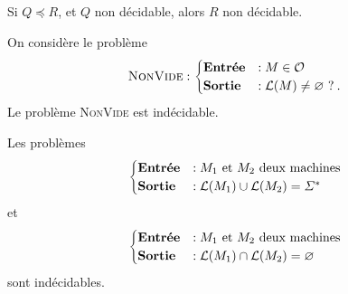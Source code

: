 \begin{crlr}
	Si $Q \preceq R$, et $Q$\/ non décidable, alors $R$\/ non décidable.
\end{crlr}

\begin{exm}
	On considère le problème \[
		\text{\textsc{NonVide}} : \begin{cases}
			\text{\textbf{Entrée}} &: M \in \mathscr{O}\\
			\text{\textbf{Sortie}} &: \mathcal{L}(M) \neq \O\ ?\:.
		\end{cases}
	\] Le problème \textsc{NonVide} est indécidable.
\end{exm}

\begin{exm}
	Les problèmes \[
		\begin{cases}
			\text{\textbf{Entrée}} &: M_1 \text{ et } M_2 \text{ deux machines}\\
			\text{\textbf{Sortie}} &: \mathcal{L}(M_1) \cup \mathcal{L}(M_2) = \Sigma^*
		\end{cases}
	\] et \[
		\begin{cases}
			\text{\textbf{Entrée}} &: M_1 \text{ et } M_2 \text{ deux machines}\\
			\text{\textbf{Sortie}} &: \mathcal{L}(M_1) \cap \mathcal{L}(M_2) = \O
		\end{cases}
	\] sont indécidables.
\end{exm}



